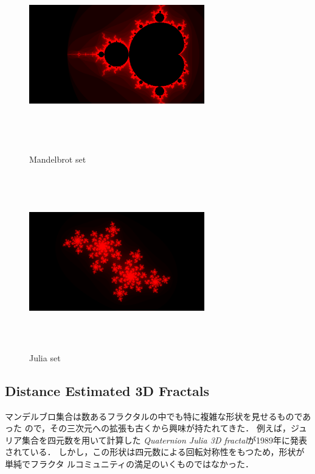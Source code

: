 \begin{figure}[htbp]
 \begin{minipage}{0.49\hsize}
  \begin{center}
   \includegraphics[width=3in, height=3in, keepaspectratio]{../img/fractal/mandelbrot.pdf}
   \caption{Mandelbrot set}
   \label{fig:mandelbrot}
  \end{center}
 \end{minipage}
 \begin{minipage}{0.49\hsize}
     \includegraphics[width=3in, height=3in, keepaspectratio]{../img/fractal/julia.pdf}
   \caption{Julia set}
   \label{fig:julia}
 \end{minipage}
\end{figure}

\subsection{Distance Estimated 3D Fractals}

マンデルブロ集合は数あるフラクタルの中でも特に複雑な形状を見せるものであった
ので，その三次元への拡張も古くから興味が持たれてきた．
例えば，ジュリア集合を四元数を用いて計算した
\textit{Quaternion Julia 3D fractal}\cite{hart1989ray}が1989年に発表されている．
しかし，この形状は四元数による回転対称性をもつため，形状が単純でフラクタ
ルコミュニティの満足のいくものではなかった．

